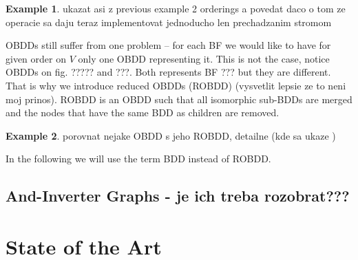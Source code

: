 \documentclass[
  digital, %
  twoside, %
  table,   %
  nolof,     %
  nolot,     %
]{fithesis3}
\theoremstyle{definition}
\newtheorem{example}{Example}
\theoremstyle{remark}
\begin{document}
\begin{example}
ukazat asi z previous example 2 orderings a povedat daco o tom ze operacie sa daju teraz implementovat jednoducho len prechadzanim stromom
\end{example}

OBDDs still suffer from one problem -- for each BF we would like to have for given order on $V$ only one OBDD representing it. This is not the case, notice OBDDs on fig. ????? and ???. Both represents BF ??? but they are different. That is why we introduce reduced OBDDs (ROBDD) (vysvetlit lepsie ze to neni moj prinos). ROBDD is an OBDD such that all isomorphic sub-BDDs are merged and the nodes that have the same BDD as children are removed.

\begin{example}
porovnat nejake OBDD s jeho ROBDD, detailne (kde sa ukaze )
\end{example}

In the following we will use the term BDD instead of ROBDD.

\section{And-Inverter Graphs - je ich treba rozobrat???}

\chapter{State of the Art}



\end{document}
